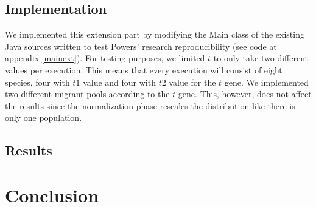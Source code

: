 \documentclass[runningheads]{llncs}
\begin{document}
\subsection{Implementation}
We implemented this extension part by modifying the Main class of the
existing Java sources written to test Powers' research
reproducibility (see code at appendix \ref{mainext}). For testing
purposes, we limited $t$ to only take two different values per
execution. This means that every execution will consist of eight species,
four with $t1$ value and four with $t2$ value for the $t$ gene. We
implemented two different migrant pools according to the $t$
gene. This, however, does not affect the results since the
normalization phase rescales the distribution like there is only one
population.
\subsection{Results}


\section{Conclusion}
\end{document}

